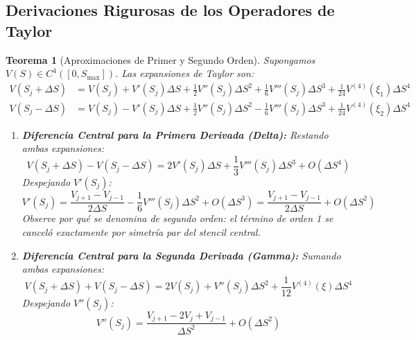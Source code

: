 \documentclass[11pt,a4paper]{article}
\newtheorem{theorem}{Teorema}[section]
\begin{document}
\subsection{Derivaciones Rigurosas de los Operadores de Taylor}
\begin{theorem}[Aproximaciones de Primer y Segundo Orden]
Supongamos $V(S) \in C^4([0, S_{\max}])$. Las expansiones de Taylor son:
\begin{align}
    V(S_j + \Delta S) &= V(S_j) + V'(S_j)\Delta S + \frac{1}{2}V''(S_j)\Delta S^2 + \frac{1}{6}V'''(S_j)\Delta S^3 + \frac{1}{24}V^{(4)}(\xi_1)\Delta S^4 \\
    V(S_j - \Delta S) &= V(S_j) - V'(S_j)\Delta S + \frac{1}{2}V''(S_j)\Delta S^2 - \frac{1}{6}V'''(S_j)\Delta S^3 + \frac{1}{24}V^{(4)}(\xi_2)\Delta S^4
\end{align}
\begin{enumerate}
    \item \textbf{Diferencia Central para la Primera Derivada (Delta):} Restando ambas expansiones:
    \begin{equation}
        V(S_j + \Delta S) - V(S_j - \Delta S) = 2 V'(S_j)\Delta S + \frac{1}{3} V'''(S_j)\Delta S^3 + O(\Delta S^4)
    \end{equation}
    Despejando $V'(S_j)$:
    \begin{equation}
        V'(S_j) = \frac{V_{j+1} - V_{j-1}}{2 \Delta S} - \frac{1}{6} V'''(S_j)\Delta S^2 + O(\Delta S^3) = \frac{V_{j+1} - V_{j-1}}{2 \Delta S} + O(\Delta S^2)
    \end{equation}
    Observe por qué se denomina de segundo orden: el término de orden 1 se canceló exactamente por simetría par del stencil central.
    \item \textbf{Diferencia Central para la Segunda Derivada (Gamma):} Sumando ambas expansiones:
    \begin{equation}
        V(S_j + \Delta S) + V(S_j - \Delta S) = 2 V(S_j) + V''(S_j)\Delta S^2 + \frac{1}{12} V^{(4)}(\xi)\Delta S^4
    \end{equation}
    Despejando $V''(S_j)$:
    \begin{equation}
        V''(S_j) = \frac{V_{j+1} - 2V_j + V_{j-1}}{\Delta S^2} + O(\Delta S^2)
    \end{equation}
\end{enumerate}
\end{theorem}
\end{document}
